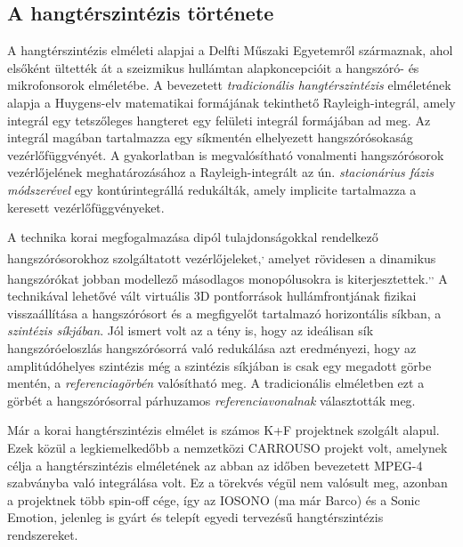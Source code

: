 \documentclass[10pt,twoside]{article}
\theoremstyle{thesisgroupstyle}
\theoremstyle{indented}
\begin{document}
\subsection{A hangtérszintézis története}
%
A hangtérszintézis elméleti alapjai a Delfti Műszaki Egyetemről származnak, ahol elsőként ültették át a szeizmikus hullámtan alapkoncepcióit a hangszóró- és mikrofonsorok elméletébe.
A bevezetett \emph{tradicionális hangtérszintézis} elméletének alapja a Huygens-elv matematikai formájának tekinthető Rayleigh-integrál, amely integrál egy tetszőleges hangteret egy felületi integrál formájában ad meg.
Az integrál magában tartalmazza egy síkmentén elhelyezett hangszórósokaság vezérlőfüggvényét.
A gyakorlatban is megvalósítható vonalmenti hangszórósorok vezérlőjelének meghatározásához a Rayleigh-integrált az ún. \emph{stacionárius fázis módszerével} egy kontúrintegrállá redukálták, amely implicite tartalmazza a keresett vezérlőfüggvényeket.

A technika korai megfogalmazása dipól tulajdonságokkal rendelkező hangszórósorokhoz szolgáltatott vezérlőjeleket,\textsuperscript{,} amelyet rövidesen a dinamikus hangszórókat jobban modellező másodlagos monopólusokra is kiterjesztettek.\textsuperscript{,}\textsuperscript{,}
A technikával lehetővé vált virtuális 3D pontforrások hullámfrontjának fizikai visszaállítása a hangszórósort és a megfigyelőt tartalmazó horizontális síkban, a \emph{szintézis síkjában}.
Jól ismert volt az a tény is, hogy az ideálisan sík hangszóróeloszlás hangszórósorrá való redukálása azt eredményezi, hogy az amplitúdóhelyes szintézis még a szintézis síkjában is csak egy megadott görbe mentén, a \emph{referenciagörbén} valósítható meg.
A tradicionális elméletben ezt a görbét a hangszórósorral párhuzamos \emph{referenciavonalnak} választották meg.

Már a korai hangtérszintézis elmélet is számos K+F projektnek szolgált alapul. 
Ezek közül a legkiemelkedőbb a nemzetközi CARROUSO projekt volt, amelynek célja a hangtérszintézis elméletének az abban az időben bevezetett MPEG-4 szabványba való integrálása volt.
Ez a törekvés végül nem valósult meg, azonban a projektnek több spin-off cége, így az IOSONO (ma már Barco) és a Sonic Emotion, jelenleg is gyárt és telepít egyedi tervezésű hangtérszintézis rendszereket.
\end{document}
